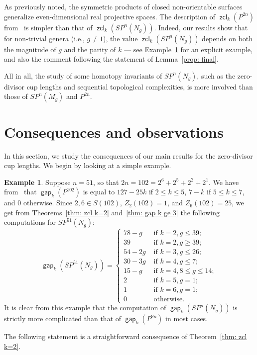 \documentclass[amscd,amssymb,verbatim,10pt]{amsart}
\numberwithin{equation}{section}
\theoremstyle{plain}
\theoremstyle{definition}
\newtheorem{ex}[thm]{Example}
\DeclareMathOperator{\zcl}{{\mathsf{zcl}}}
\DeclareMathOperator{\gap}{{\mathsf{gap}}}
\begin{document}
As previously noted, the symmetric products of closed non-orientable surfaces generalize even-dimensional real projective spaces. The description of $\zcl_k(P^{2n})$ from~\cite{Dav} is simpler than that of $\zcl_k(SP^n(N_g))$. Indeed, our results show that for non-trivial genera (i.e., $g\ne 1$), the value $\zcl_k(SP^n(N_g))$ depends on both the magnitude of $g$ and the parity of $k$ --- see Example~\ref{ex: example} for an explicit example, and also the comment following the statement of Lemma~\ref{prop: final}.

All in all, the study of some homotopy invariants of $SP^n(N_g)$, such as the zero-divisor cup lengths and sequential topological complexities, is more involved than those of $SP^n(M_g)$ and $P^{2n}$.




\section{Consequences and observations}\label{sec: observations1}
In this section, we study the consequences of our main results for the zero-divisor cup lengths. We begin by looking at a simple example.

\begin{ex}\label{ex: example}
Suppose $n=51$, so that $2n=102=2^6+2^5+2^2+2^1$. We have from~\cite{Dav} that $\gap_k(P^{102})$ is equal to $127-25k$ if $2\le k \le 5$, $7-k$ if $5\le k \le 7$, and $0$ otherwise. Since $2,6\in S(102)$, $Z_2(102)=1$, and $Z_6(102)=25$, we get from Theorems~\ref{thm: zcl k=2} and~\ref{thm: gap k ge 3} the following computations for $SP^{51}(N_g)$:
\[
\gap_k(SP^{51}(N_g))=\begin{cases}
78-g & \text{ if }k=2,g\le 39;
\\
39 & \text{ if }k=2,g\ge 39;
\\
54-2g & \text{ if }k=3,g\le 26;
\\
30-3g & \text{ if }k=4,g\le 7;
\\
15-g & \text{ if }k=4,8\le g\le 14;
\\
2 & \text{ if }k=5,g=1;
\\
1 & \text{ if }k=6,g=1;
\\
0 & \text{ otherwise}.
\end{cases}
\]
It is clear from this example that the computation of $\gap_k(SP^n(N_g))$ is strictly more complicated than that of $\gap_k(P^{2n})$ in most cases.
\end{ex}

The following statement is a straightforward consequence of Theorem~\ref{thm: zcl k=2}. 
\end{document}
